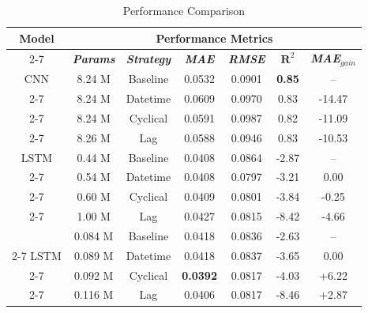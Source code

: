 \documentclass[conference]{IEEEtran}
\begin{document}
	\begin{table}[htbp]
		\caption{Performance Comparison}
		\begin{center}
			\renewcommand{\arraystretch}{1.3} %
			\begin{tabular}{|c|c|c|c|c|c|c|}
				\hline
				\textbf{Model} & \multicolumn{6}{|c|}{\textbf{Performance Metrics}} \\ 
				\cline{2-7}
				\textbf{} & \textbf{\textit{Params}} & \textbf{\textit{Strategy}} & \textbf{\textit{MAE}} & \textbf{\textit{RMSE}} & \textbf{\textit{$\mathbf{R}^{2}$}} & \textbf{\textit{MAE$_{gain}$}} \\
				\hline
				CNN & 8.24 M & Baseline & 0.0532 & 0.0901 & \textbf{0.85} & -- \\
				\cline{2-7}
				& 8.24 M & Datetime & 0.0609 & 0.0970 & 0.83 & -14.47 \\
				\cline{2-7}
				& 8.24 M & Cyclical & 0.0591 & 0.0987 & 0.82 & -11.09 \\
				\cline{2-7}
				& 8.26 M & Lag & 0.0588 & 0.0946 & 0.83 & -10.53 \\
				\hline
				LSTM & 0.44 M & Baseline & 0.0408 & 0.0864 & -2.87 & -- \\
				\cline{2-7}
				& 0.54 M & Datetime & 0.0408 & 0.0797 & -3.21 & 0.00 \\
				\cline{2-7}
				& 0.60 M & Cyclical & 0.0409 & 0.0801 & -3.84 & -0.25 \\
				\cline{2-7}
				& 1.00 M & Lag & 0.0427 & 0.0815 & -8.42 & -4.66 \\
				\hline
				\shortstack{AR} & 0.084 M & Baseline & 0.0418 & 0.0836 & -2.63 & -- \\
				\cline{2-7}
				LSTM 
				& 0.089 M & Datetime & 0.0418 & 0.0837 & -3.65 & 0.00 \\
				\cline{2-7}
				& 0.092 M & Cyclical & \textbf{0.0392} & 0.0817 & -4.03 & +6.22 \\
				\cline{2-7}
				& 0.116 M & Lag & 0.0406 & 0.0817 & -8.46 & +2.87 \\
				\hline
			\end{tabular}
			\label{tab:performance_comparison}
		\end{center}
	\end{table}
	
\end{document}
